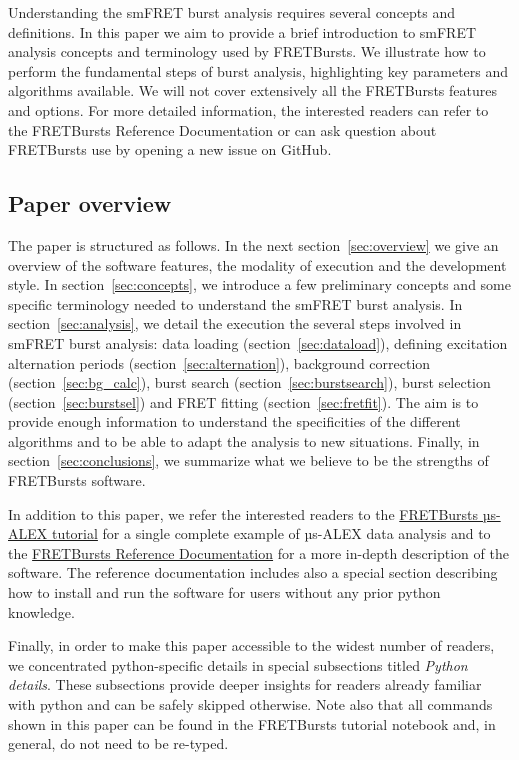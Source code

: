 Understanding the smFRET burst analysis requires several concepts and definitions.
In this paper we aim to provide a brief introduction to smFRET analysis concepts
and terminology used by FRETBursts. We illustrate how to perform
the fundamental steps of burst analysis, highlighting key parameters
and algorithms available. We will not cover extensively all the FRETBursts
features and options. For more detailed information, the interested readers can refer
to the FRETBursts Reference Documentation or can ask question about FRETBursts use by opening 
a new issue on GitHub.

\subsection{Paper overview}

The paper is structured as follows.
In the next section~\ref{sec:overview} we give an overview of the software features,
the modality of execution and the development style.
In section~\ref{sec:concepts}, we
introduce a few preliminary concepts and some specific terminology needed
to understand the smFRET burst analysis.
In section~\ref{sec:analysis}, we detail the execution the several steps involved
in smFRET burst analysis: data loading (section~\ref{sec:dataload}), defining
excitation alternation periods (section~\ref{sec:alternation}), background
correction (section~\ref{sec:bg_calc}), burst search (section~\ref{sec:burstsearch}),
burst selection (section~\ref{sec:burstsel}) and FRET fitting (section~\ref{sec:fretfit}).
The aim is to provide enough information to understand the specificities of
the different algorithms and to be able to adapt the analysis to new situations.
Finally, in section~\ref{sec:conclusions}, we summarize what we believe to be
the strengths of FRETBursts software.

In addition to this paper, we refer the interested readers to the
\href{http://nbviewer.ipython.org/github/tritemio/FRETBursts_notebooks/blob/master/notebooks/FRETBursts\%20-\%20us-ALEX\%20smFRET\%20burst\%20analysis.ipynb}{FRETBursts µs-ALEX tutorial}
for a single complete example of µs-ALEX data analysis and to the
\href{http://fretbursts.readthedocs.org/}{FRETBursts Reference Documentation}
for a more in-depth description of the software. The reference documentation
includes also a special section describing how to install and run the software
for users without any prior python knowledge.

Finally, in order to make this paper accessible to the widest number of readers,
we concentrated python-specific details in special subsections titled
\textit{Python details}. These subsections provide deeper insights for readers
already familiar with python and can be safely skipped otherwise. Note also
that all commands shown in this paper can be found in the FRETBursts tutorial notebook
and, in general, do not need to be re-typed.

